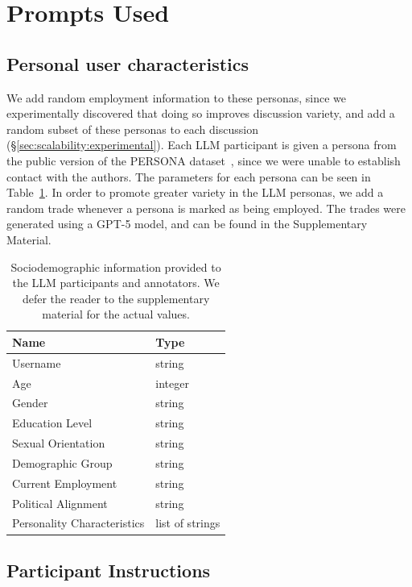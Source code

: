 \section{Prompts Used}
\label{sec:appendix:prompts}


\subsection{Personal user characteristics}
\label{ssec:app:sdbs}

We add random employment information to these personas, since we experimentally discovered that doing so improves discussion variety, and add a random subset of these personas to each discussion (\S\ref{sec:scalability:experimental}). Each LLM participant is given a persona from the public version of the PERSONA dataset~\cite{castricato-etal-2025-persona}, since we were unable to establish contact with the authors. The parameters for each persona can be seen in Table~\ref{tab:sdb}. In order to promote greater variety in the LLM personas, we add a random trade whenever a persona is marked as being employed. The trades were generated using a GPT-5 model, and can be found in the Supplementary Material.

\begin{table}[t]
	\centering
	\caption{Sociodemographic information provided to the LLM participants and annotators. We defer the reader to the supplementary material for the actual values.}
	\label{tab:sdb}
	\begin{tabular}{ll}
		\toprule
		\textbf{Name} & \textbf{Type} \\
		\midrule
		Username & string \\
		Age & integer \\
		Gender & string \\
		Education Level & string \\
		Sexual Orientation & string \\
		Demographic Group & string \\
		Current Employment & string \\
		Political Alignment & string \\
		Personality Characteristics & list of strings \\
		\bottomrule
	\end{tabular}
	
\end{table}


\subsection{Participant Instructions}
\label{sssec:appendix:roles}


